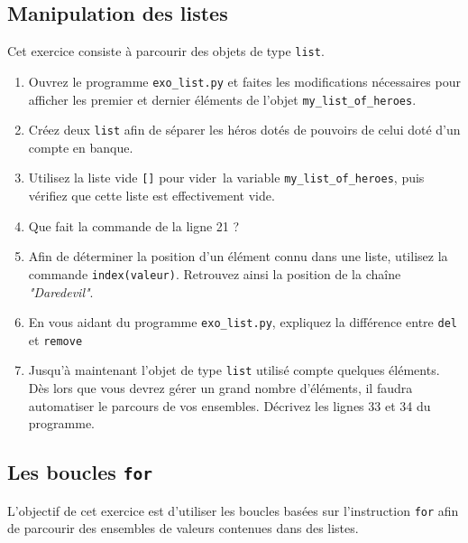 



\subsection{Manipulation des listes}
Cet exercice consiste à parcourir des objets de type \texttt{list}.

\begin{enumerate}
\item  Ouvrez   le  programme  \texttt{exo\_list.py}  et   faites  les
  modifications  nécessaires pour  afficher  les premier  et  dernier
  éléments de l'objet \texttt{my\_list\_of\_heroes}.  %
\item  Créez deux  \texttt{list} afin  de séparer  les héros  dotés de
  pouvoirs de celui doté d'un compte en banque.  %
\item  Utilisez  la liste  vide  \texttt{[]}  pour \og{}vider\fg\  la  variable
  \texttt{my\_list\_of\_heroes},
  puis  vérifiez que  cette liste
  est effectivement vide.  %
\item Que fait la commande de la ligne 21 ?  %
\item  Afin de  déterminer la  position  d'un élément  connu dans  une
  liste, utilisez la commande \texttt{index(valeur)}.  Retrouvez ainsi
  la position de la chaîne \textit{"Daredevil"}.

\item En vous aidant  du programme \texttt{exo\_list.py}, expliquez la
  différence entre \texttt{del} et \texttt{remove}

\item Jusqu'à maintenant l'objet de type \texttt{list} utilisé compte quelques
  éléments. Dès lors que vous  devrez gérer un grand nombre d'éléments,
  il faudra  automatiser le parcours  de vos ensembles.   Décrivez les
  lignes 33 et 34 du programme.
\end{enumerate}



\subsection{Les boucles  \texttt{for}}

L'objectif  de cet  exercice est  d'utiliser les  boucles basées sur
l'instruction \texttt{for} afin  de  parcourir  des  ensembles  de
valeurs  contenues  dans  des listes.



